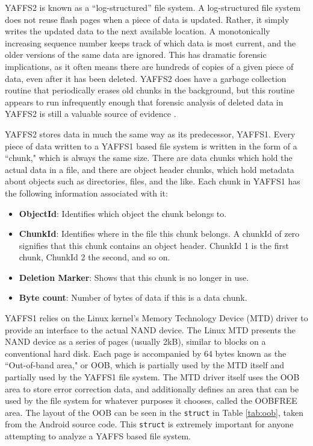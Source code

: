 YAFFS2 is known as a ``log-structured'' file system.  A log-structured file system does not reuse flash pages when a piece of data is
updated.  Rather, it simply writes the updated data to the next available location.  A monotonically increasing sequence number
keeps track of which data is most current, and the older versions of the same data are ignored.  This has dramatic forensic
implications, as it often means there are hundreds of copies of a given piece of data, even after it has been deleted.  YAFFS2 does
have a garbage collection routine that periodically erases old chunks in the background, but this routine appears to run
infrequently enough that forensic analysis of deleted data in YAFFS2 is still a valuable source of evidence \cite{naval}. 

YAFFS2 stores data in much the same way as its predecessor, YAFFS1.  Every piece of data written to a YAFFS1 based file system is
written in the form of a ``chunk," which is always the same size.  There are data chunks which hold the actual data in a file, and
there are object header chunks, which hold metadata about objects such as directories, files, and the like.  Each chunk in YAFFS1
has the following information associated with it:

\begin{itemize}
	\item {\bf ObjectId}: Identifies which object the chunk belongs to.\
	\item {\bf ChunkId}: Identifies where in the file this chunk belongs. 
		A chunkId of zero signifies that this chunk contains an object header. 
		ChunkId 1 is the first chunk, ChunkId 2 the second, and so on.
	\item {\bf Deletion Marker}: Shows that this chunk is no longer in use.
	\item {\bf Byte count}: Number of bytes of data if this is a data chunk.
\end{itemize}
\cite{howyaffsworks}

YAFFS1 relies on the Linux kernel's Memory Technology Device (MTD) driver to provide an interface to the actual NAND device.  The
Linux MTD presents the NAND device as a series of pages (usually 2kB), similar to blocks on a conventional hard disk.  Each page is
accompanied by 64 bytes known as the ``Out-of-band area," or OOB, which is partially used by the MTD itself and partially used by
the YAFFS1 file system. The MTD driver itself uses the OOB area to store error correction data, and additionally defines an area that
can be used by the file system for whatever purposes it chooses, called the OOBFREE area.  The layout of the OOB can be seen in the
\texttt{struct} in Table \ref{tab:oob}, taken from the Android source code. This \texttt{struct} is extremely important for anyone
attempting to analyze a YAFFS based file system.

